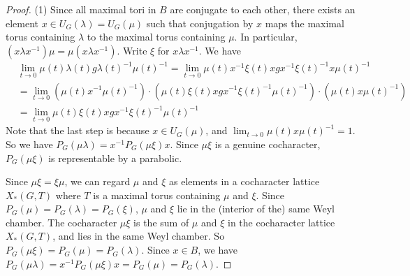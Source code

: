 \documentclass[10pt,a4paper,twoside]{article}
\begin{document}
\begin{proof}
(1)
Since all maximal tori in $B$ are conjugate to each other, there exists 
an element $x \in U_G(\lambda) = U_G(\mu)$ such that 
conjugation by $x$ maps the maximal torus containing $\lambda$
to the maximal torus containing $\mu$.
In particular, $(x \lambda x^{-1}) \mu = \mu (x\lambda x^{-1})$.
Write $\xi$ for $x \lambda x^{-1}$.
We have 
\begin{align*}
&\lim_{t\to 0} \mu(t) \lambda(t) g \lambda(t)^{-1}\mu(t)^{-1}  = 
\lim_{t\to 0} \mu(t) x^{-1}\xi(t) x g  x^{-1} \xi(t)^{-1} x \mu(t)^{-1} \\
&= \lim_{t\to 0} (\mu(t) x^{-1} \mu(t)^{-1})\cdot(\mu(t)\xi(t) x g  x^{-1} \xi(t)^{-1} \mu(t)^{-1})\cdot (\mu(t) x \mu(t)^{-1}) \\
&= \lim_{t\to 0} \mu(t)\xi(t) x g  x^{-1} \xi(t)^{-1} \mu(t)^{-1}
\end{align*}
Note that the last step is because $x\in U_G(\mu)$, and $\lim_{t\to 0} \mu(t) x \mu(t)^{-1}=1$.
So we have $P_G(\mu\lambda) = x^{-1}P_G(\mu\xi)x$.
Since $\mu\xi$ is a genuine cocharacter, $P_G(\mu\xi)$ is representable by a parabolic.

Since $\mu\xi =\xi \mu$, we can regard $\mu$ and $\xi$ as elements in a cocharacter lattice $X_*(G,T)$
where $T$ is a maximal torus containing $\mu$ and $\xi$.
Since $P_G(\mu) = P_G(\lambda) = P_G(\xi)$, $\mu$ and $\xi$ lie in the (interior of the) same Weyl chamber.
The cocharacter $\mu\xi$ is the sum of $\mu$ and $\xi$ in the cocharacter lattice $X_*(G,T)$,
and lies in the same Weyl chamber.
So $P_G(\mu\xi) = P_G(\mu) = P_G(\lambda)$.
Since $x \in B$, we have
$P_G(\mu\lambda) = x^{-1}P_G(\mu\xi)x = P_G(\mu)=P_G(\lambda)$.

\end{proof}
\end{document}
